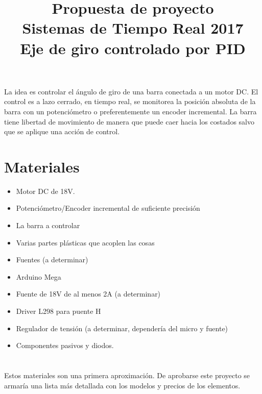 \documentclass[a4paper,11pt]{article}
\title{Propuesta de proyecto
		\\Sistemas de Tiempo Real 2017
		\\{\Large Eje de giro controlado por PID}
}
\author{}
\date{}
\begin{document}
\maketitle

La idea es controlar el ángulo de giro de una barra conectada a un motor DC. El control es a lazo cerrado, en tiempo real, se monitorea la posición absoluta de la barra con un potenciómetro o preferentemente un encoder incremental. La barra tiene libertad de movimiento de manera que puede caer hacia los costados salvo que se aplique una acción de control. 

\section*{Materiales}
\begin{itemize}
	\item Motor DC de 18V.
	\item Potenciómetro/Encoder incremental de suficiente precisión
	\item La barra a controlar
	\item Varias partes plásticas que acoplen las cosas
	\item Fuentes (a determinar)
	\item Arduino Mega
	\item Fuente de 18V de al menos 2A (a determinar)
	\item Driver  L298 para puente H
	\item Regulador de tensión (a determinar, dependería del micro y fuente)
	\item Componentes pasivos y diodos.
\end{itemize}

\section*{}
Estos materiales son una primera aproximación. De aprobarse este proyecto se armaría una lista más detallada con los modelos y precios de los elementos. 
\end{document}
